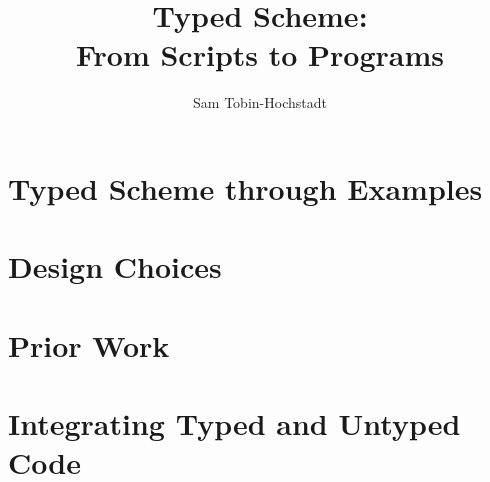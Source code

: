 \documentclass[12pt,final,oldfontcommands]{memoir}
\title{Typed Scheme: \\ {\large \textrm{From Scripts to Programs}}}
\author{Sam Tobin-Hochstadt}
\begin{document}
\frontmatter

\makeccsthesistitle



\cleardoublepage
\tableofcontents
\cleardoublepage
\listoffigures



\newsavebox{\boxedtextbin}
\newenvironment{boxedtext}
{\begin{lrbox}{\boxedtextbin}
      \begin{minipage}{0.95 \textwidth}    }
{\end{minipage}\end{lrbox}
\begin{center}\fbox{\usebox{\boxedtextbin}}\end{center}}

\newbox\exbox

\newenvironment{exmp}{
\refstepcounter{ex}%
\begin{boxedtext}
\setbox\exbox=\vbox{\par\hfill\framebox{\small Example~\theex}}
\usebox\exbox
\vskip-1em
\vskip-\ht\exbox
\begin{SingleSpace*}}
{\end{SingleSpace*}
\end{boxedtext}}

\let\cite\citep

\mainmatter




\chapter{Typed Scheme through Examples}
\label{chap:overview}



\chapter{Design Choices}
\label{chap:design}


\chapter{Prior Work}


\chapter{Integrating Typed and Untyped Code}
\label{chap:integrate}

\end{document}
